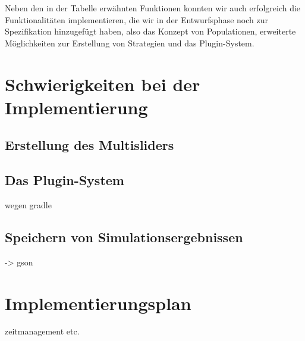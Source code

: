 \documentclass[parskip=full,11pt]{scrartcl}
\begin{document}
Neben den in der Tabelle erwähnten Funktionen konnten wir auch erfolgreich die Funktionalitäten implementieren, die wir in der Entwurfsphase noch zur Spezifikation hinzugefügt haben, also das Konzept von Populationen, erweiterte Möglichkeiten zur Erstellung von Strategien und das Plugin-System.

\section{Schwierigkeiten bei der Implementierung}

\subsection{Erstellung des Multisliders}

\subsection{Das Plugin-System}
wegen gradle

\subsection{Speichern von Simulationsergebnissen}
-> gson

\section{Implementierungsplan}
zeitmanagement etc.
\end{document}
